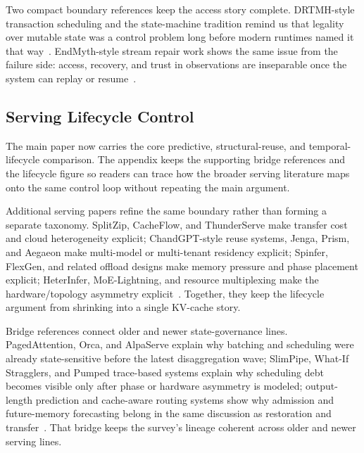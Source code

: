 Two compact boundary references keep the access story complete. DRTMH-style transaction scheduling and the state-machine tradition remind us that legality over mutable state was a control problem long before modern runtimes named it that way~\cite{ren2015drtmh,schneider1990state}. EndMyth-style stream repair work shows the same issue from the failure side: access, recovery, and trust in observations are inseparable once the system can replay or resume~\cite{zamanian2017endmyth}.

\subsection{Serving Lifecycle Control}

The main paper now carries the core predictive, structural-reuse, and temporal-lifecycle comparison. The appendix keeps the supporting bridge references and the lifecycle figure so readers can trace how the broader serving literature maps onto the same control loop without repeating the main argument.

Additional serving papers refine the same boundary rather than forming a separate taxonomy. SplitZip, CacheFlow, and ThunderServe make transfer cost and cloud heterogeneity explicit; ChandGPT-style reuse systems, Jenga, Prism, and Aegaeon make multi-model or multi-tenant residency explicit; Spinfer, FlexGen, and related offload designs make memory pressure and phase placement explicit; HeterInfer, MoE-Lightning, and resource multiplexing make the hardware/topology asymmetry explicit~\cite{guo2026splitzip,nian2026cacheflow,jiang2025thunderserve,gao2025weaver,zhang2025jenga,yu2025prism,fan2025spinfer,sheng2023flexgen,chen2025heteroinfer,cao2025moelightning,he2025resourcemultiplexing}. Together, they keep the lifecycle argument from shrinking into a single KV-cache story.

Bridge references connect older and newer state-governance lines. PagedAttention, Orca, and AlpaServe explain why batching and scheduling were already state-sensitive before the latest disaggregation wave; SlimPipe, What-If Stragglers, and Pumped trace-based systems explain why scheduling debt becomes visible only after phase or hardware asymmetry is modeled; output-length prediction and cache-aware routing systems show why admission and future-memory forecasting belong in the same discussion as restoration and transfer~\cite{kwon2023pagedattention,yu2022orca,li2023alpaserve,liu2025slimpipe,lin2025whatifstragglers,gong2025pastfuture,jiang2025shadowviews}. That bridge keeps the survey's lineage coherent across older and newer serving lines.

